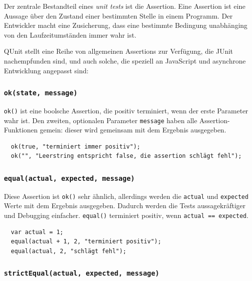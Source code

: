 \documentclass[11pt, a4paper]{article}
\begin{document}
Der zentrale Bestandteil eines \emph{unit tests} ist die Assertion. Eine
Assertion ist eine Aussage über den Zustand einer bestimmten Stelle in
einem Programm\cite{wikipedia_assertion_2011}. Der Entwickler macht eine
Zusicherung, dass eine bestimmte Bedingung unabhänging von den Laufzeitumständen
immer wahr ist.

QUnit stellt eine Reihe von allgemeinen Assertions zur Verfügung,
die JUnit nachempfunden sind, und auch solche, die speziell an JavaScript
und asynchrone Entwicklung angepasst sind\cite{zaefferer_qunit_2011}:

\subsubsection*{\texttt{ok(state, message)}}

\texttt{ok()} ist eine boolsche Assertion, die positiv terminiert, wenn der
erste Parameter wahr ist. Den zweiten, optionalen Parameter \texttt{message} haben alle
Assertion-Funktionen gemein: dieser wird gemeinsam mit dem Ergebnis
ausgegeben.

\begin{verbatim}
  ok(true, "terminiert immer positiv");
  ok("", "Leerstring entspricht false, die assertion schlägt fehl");
\end{verbatim}

\subsubsection*{\texttt{equal(actual, expected, message)}}

Diese Assertion ist \texttt{ok()} sehr ähnlich, allerdings werden die
\texttt{actual} und \texttt{expected} Werte mit dem Ergebnis ausgegeben. Dadurch
werden die Tests aussagekräftiger und Debugging einfacher. \texttt{equal()}
terminiert positiv, wenn \texttt{actual == expected}. 

\begin{verbatim}
  var actual = 1;
  equal(actual + 1, 2, "terminiert positiv");
  equal(actual, 2, "schlägt fehl");
\end{verbatim}

\clearpage

\subsubsection*{\texttt{strictEqual(actual, expected, message)}}
\end{document}
